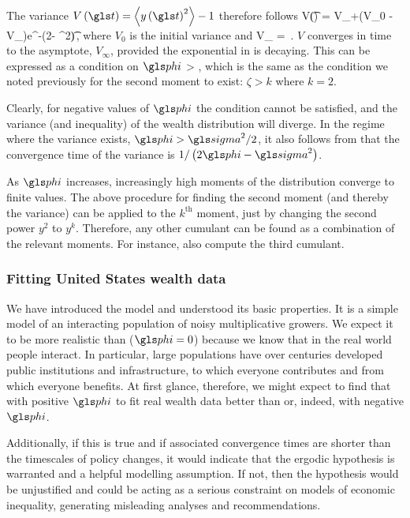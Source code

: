 The variance $V\left(\t\right)=\ave{y\left(\t\right)^2}-1$ therefore follows
\be
V\left(\t\right) = V_{\infty}+\left(V_0 - V_{\infty}\right)e^{-\left(2\gphi - \gsigma^2\right)\t}\,,
\ee
where $V_0$ is the initial variance and
\be
V_{\infty} = \,.
\ee
$V$ converges in time to the asymptote, $V_{\infty}$, provided the exponential in  is decaying. 
This can be expressed as a condition on $\gphi$
\be
\gphi > ,
\ee
which is the same as the condition we noted previously for the second moment to exist: $\zeta>k$ where $k=2$.

Clearly, for negative values of $\gphi$ the condition cannot be satisfied, and the variance (and inequality) of the wealth distribution will diverge. In the regime where the variance exists, $\gphi > \gsigma^2/2$, it also follows from  that the convergence time of the variance is $1/\left(2\gphi - \gsigma^2\right)$.

As $\gphi$ increases, increasingly high moments of the distribution converge to finite values. The above procedure for finding the second moment (and thereby the variance) can be applied to the $k^\text{th}$ moment, just by changing the second power $y^2$ to $y^k$. Therefore, any other cumulant can be found as a combination of the relevant moments. For instance, \cite{LiuSerota2016} also compute the third cumulant.


\subsubsection{Fitting United States wealth data}
We have introduced the \RGBM model and understood its basic properties. It is a simple model of an interacting population of noisy multiplicative growers. We expect it to be more realistic than \GBM ($\gphi=0$) because we know that in the real world people interact. In particular, large populations have over centuries developed public institutions and infrastructure, to which everyone contributes and from which everyone benefits. At first glance, therefore, we might expect to find that \RGBM with positive $\gphi$ to fit real wealth data better than \GBM or, indeed, \RGBM with negative $\gphi$.

Additionally, if this is true and if associated convergence times are shorter than the timescales of policy changes, it would indicate that the ergodic hypothesis is warranted and a helpful modelling assumption. If not, then the hypothesis would be unjustified and could be acting as a serious constraint on models of economic inequality, generating misleading analyses and recommendations.

